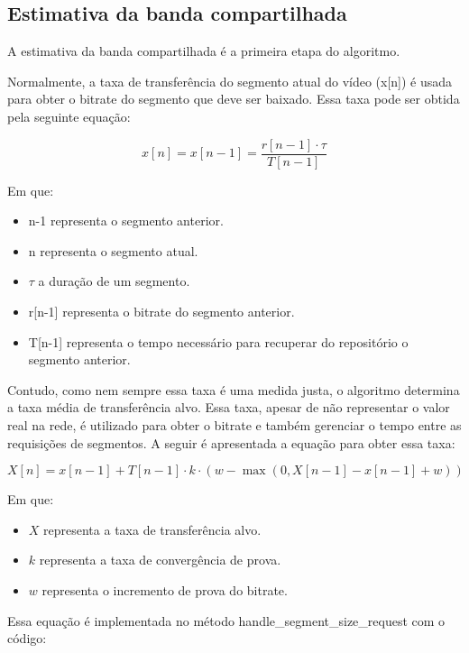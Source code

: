 \documentclass[10pt,twocolumn,letterpaper]{article}
\begin{document}
\subsection{Estimativa da banda compartilhada}

A estimativa da banda compartilhada é a primeira etapa do algoritmo.

Normalmente, a taxa de transferência do segmento atual do vídeo (x[n]) é usada para obter o bitrate do segmento que deve ser baixado. Essa taxa pode ser obtida pela seguinte equação:

\begin{equation} \label{actual_throughput}
	x[n] = x[n-1] = \frac{r[n-1] \cdot \tau}{T[n-1]} 
\end{equation}

Em que:
\begin{itemize}
	\item n-1 representa o segmento anterior.
	\item n representa o segmento atual.
	\item $\tau$ a duração de um segmento.
	\item r[n-1] representa o bitrate do segmento anterior.
	\item T[n-1] representa o tempo necessário para recuperar do repositório o segmento anterior.
\end{itemize}

Contudo, como nem sempre essa taxa é uma medida justa, o algoritmo determina a taxa média de transferência alvo. Essa taxa, apesar de não representar o valor real na rede, é utilizado para obter o bitrate e também gerenciar o tempo entre as requisições de segmentos. A seguir é apresentada a equação para obter essa taxa:

\begin{equation}\label{target_throughput}
	X[n] = x[n-1] + T[n-1] \cdot k \cdot (w - \max(0, X[n-1] - x[n-1] + w))
\end{equation}

Em que:
\begin{itemize}
	\item $X$ representa a taxa de transferência alvo.
	\item $k$ representa a taxa de convergência de prova.
	\item $w$ representa o incremento de prova do bitrate.
\end{itemize}

Essa equação é implementada no método handle\_segment\_size\_request com o código:
\end{document}
